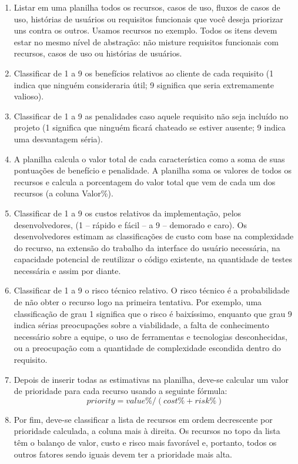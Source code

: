\documentclass[runningheads]{llncs}
\begin{document}
\begin{enumerate}
    \item Listar em uma planilha todos os recursos, casos de uso, fluxos de casos de uso, histórias de usuários ou requisitos funcionais que você deseja priorizar uns contra os outros. Usamos recursos no exemplo. Todos os itens devem estar no mesmo nível de abstração: não misture requisitos funcionais com recursos, casos de uso ou histórias de usuários.
    \item Classificar de 1 a 9 os benefícios relativos ao cliente de cada requisito (1 indica que ninguém consideraria útil; 9 significa que seria extremamente valioso).
    \item Classificar de 1 a 9 as penalidades caso aquele requisito não seja incluído no projeto (1 significa que ninguém ficará chateado se estiver ausente; 9 indica uma desvantagem séria).
    \item A planilha calcula o valor total de cada característica como a soma de suas pontuações de benefício e penalidade. A planilha soma os valores de todos os recursos e calcula a porcentagem do valor total que vem de cada um dos recursos (a coluna Valor\%).
    \item Classificar de 1 a 9 os custos relativos da implementação, pelos desenvolvedores, (1 -- rápido e fácil -- a 9 -- demorado e caro). Os desenvolvedores estimam as classificações de custo com base na complexidade do recurso, na extensão do trabalho da interface do usuário necessária, na capacidade potencial de reutilizar o código existente, na quantidade de testes necessária e assim por diante.
    \item Classificar de 1 a 9 o risco técnico relativo. O risco técnico é a probabilidade de não obter o recurso logo na primeira tentativa. Por exemplo, uma classificação de grau 1 significa que o risco é baixíssimo, enquanto que grau 9 indica sérias preocupações sobre a viabilidade, a falta de conhecimento necessário sobre a equipe, o uso de ferramentas e tecnologias desconhecidas, ou a preocupação com a quantidade de complexidade escondida dentro do requisito.
    \item Depois de inserir todas as estimativas na planilha, deve-se calcular um valor de prioridade para cada recurso usando a seguinte fórmula: 
        \begin{equation}
            priority = value\% / (cost\% + risk\%)
        \end{equation}
    \item Por fim, deve-se classificar a lista de recursos em ordem decrescente por prioridade calculada, a coluna mais à direita. Os recursos no topo da lista têm o balanço de valor, custo e risco mais favorável e, portanto, todos os outros fatores sendo iguais devem ter a prioridade mais alta. 
\end{enumerate}
\end{document}
